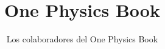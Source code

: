 \documentclass[11pt,a4paper,twoside,openany]{book}
\title{One Physics Book}
\author{Los colaboradores del One Physics Book}
\date{\bookdate}
\begin{document}
\frontmatter




\tableofcontents

\mainmatter



\appendix
\part{\omsolutionspart}


\backmatter
\printindex
\end{document}
